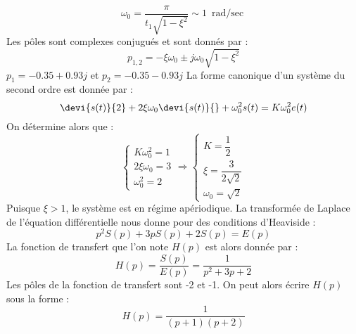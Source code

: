 \[
\omega_0=\dfrac{\pi}{t_1\sqrt{1-\xi^2}}\sim\SI{1}{\radian\per\sec} 
\]
Les pôles sont complexes conjugués et sont donnés par : 
\[
p_{1,2}=-\xi\omega_0\pm j\omega_0\sqrt{1-\xi^2}
\]
$p_1=-0.35+0.93j$ et $p_2=-0.35-0.93j$
La forme canonique d'un système du second ordre est donnée par :
\[
\devi{s(t)}{2}+2\xi\omega_0\devi{s(t)}{}+\omega_0^2s(t)=K\omega_0^2e(t)
\]
On détermine alors que :
\[
\begin{cases}
    K\omega_0^2=1\\[1em]
    2\xi\omega_0=3\\[1em]
    \omega_0^2=2
\end{cases}\Rightarrow
\begin{cases}
    K=\dfrac{1}{2}\\[1em]
    \xi=\dfrac{3}{2\sqrt{2}}\\[1em]
    \omega_0=\sqrt{2}
\end{cases}
\]
Puisque $\xi>1$, le système est en régime apériodique.
La transformée de Laplace de l'équation différentielle nous donne 
pour des conditions d'Heaviside :
\[
    p^2S(p)+3pS(p)+2S(p)=E(p)
\]
La fonction de transfert que l'on note $H(p)$ est alors donnée par :
\[
H(p)=\dfrac{S(p)}{E(p)}=\dfrac{1}{p^2+3p+2}
\]
Les pôles de la fonction de transfert sont -2 et -1. On peut alors 
écrire $H(p)$ sous la forme :
\[
H(p)=\dfrac{1}{(p+1)(p+2)}
\]

